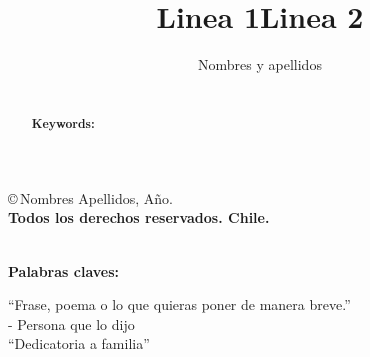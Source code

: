 \documentclass{auxiliares/umemoria}
\author{Nombres y apellidos}
\title{Linea 1{\vspace{1.5ex}\break}Linea 2}
\begin{document}
\frontmatter
\maketitle

\begin{derechoautor}
\copyright \,Nombres Apellidos, Año.\\
\textbf{Todos los derechos reservados. Chile.}
\end{derechoautor}

\begin{resumen}
\lipsum[1-2]\\

\noindent\textbf{Palabras claves:}  %
\end{resumen}

\begin{abstract}
\lipsum[1-2]\\

\noindent\textbf{Keywords:}  %
\end{abstract}

\begin{dedicatoria}
``Frase, poema o lo que quieras poner de manera breve.''\\
\vspace*{0.4cm}
- Persona que lo dijo\\
\vspace*{2.6cm}
``Dedicatoria a familia''
\end{dedicatoria}

\begin{thanks}

\end{thanks}

\cleardoublepage
{}
\tableofcontents %
\listoftables %
\listoffigures %

\mainmatter








\begingroup
    \setlength\bibitemsep{1.5ex}
    \cleardoublepage %
    {\printbibliography[title={Referencias bibliográficas}]}
\endgroup

\titleformat{\chapter}[display]{\bf\huge}{\chaptertitlename$\hspace{2.7mm}$\thechapter}{10pt}{}
\begin{appendices}
 
\end{appendices}
\end{document}
